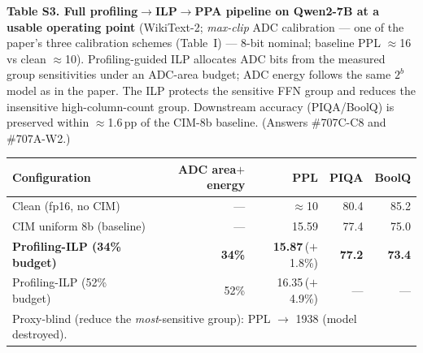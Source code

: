 \documentclass[10pt]{article}
\begin{document}
\vspace{1em}
\noindent\begin{minipage}{\textwidth}
\noindent\textbf{Table S3. Full profiling$\to$ILP$\to$PPA pipeline on Qwen2-7B at a
usable operating point} (WikiText-2; \emph{max-clip} ADC calibration --- one of the
paper's three calibration schemes (Table~I) --- 8-bit nominal; baseline PPL
$\approx$16 vs clean $\approx$10). Profiling-guided ILP allocates ADC bits from the
measured group sensitivities under an ADC-area budget; ADC energy follows the same
$2^{b}$ model as in the paper. The ILP protects the sensitive FFN group and
reduces the insensitive high-column-count group. Downstream accuracy (PIQA/BoolQ) is
preserved within $\approx$1.6\,pp of the CIM-8b baseline. (Answers \#707C-C8 and
\#707A-W2.)

\begin{center}
\begin{tabular}{lrrrr}
\toprule
Configuration & ADC area$+$energy & PPL & PIQA & BoolQ \\
\midrule
Clean (fp16, no CIM)                  & ---           & $\approx$10 & 80.4 & 85.2 \\
CIM uniform 8b (baseline)             & ---           & 15.59       & 77.4 & 75.0 \\
\textbf{Profiling-ILP (34\% budget)}  & \textbf{34\%} & \textbf{15.87}\,($+$1.8\%) & \textbf{77.2} & \textbf{73.4} \\
Profiling-ILP (52\% budget)           & 52\%          & 16.35\,($+$4.9\%) & --- & --- \\
\midrule
\multicolumn{5}{l}{Proxy-blind (reduce the \emph{most}-sensitive group): PPL $\to$ 1938 (model destroyed).}\\
\bottomrule
\end{tabular}
\end{center}
\end{minipage}
\end{document}
